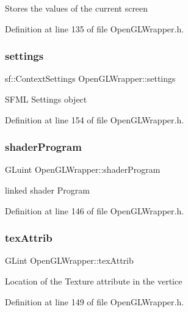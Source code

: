 Stores the values of the current screen 

Definition at line 135 of file Open\+G\+L\+Wrapper.\+h.

\mbox{\label{classOpenGLWrapper_a7d4d65ea4174aad513c93a7e287c46d5}} 
\subsubsection{\texorpdfstring{settings}{settings}}
{\footnotesize\ttfamily sf\+::\+Context\+Settings Open\+G\+L\+Wrapper\+::settings\hspace{0.3cm}{\ttfamily [private]}}

S\+F\+ML Settings object 

Definition at line 154 of file Open\+G\+L\+Wrapper.\+h.

\mbox{\label{classOpenGLWrapper_a171549c356bdf33cef0e24bfdf1f2d25}} 
\subsubsection{\texorpdfstring{shaderProgram}{shaderProgram}}
{\footnotesize\ttfamily G\+Luint Open\+G\+L\+Wrapper\+::shader\+Program\hspace{0.3cm}{\ttfamily [private]}}

linked shader Program 

Definition at line 146 of file Open\+G\+L\+Wrapper.\+h.

\mbox{\label{classOpenGLWrapper_a4584c807d7a7fa892de4e30b7faad65a}} 
\subsubsection{\texorpdfstring{texAttrib}{texAttrib}}
{\footnotesize\ttfamily G\+Lint Open\+G\+L\+Wrapper\+::tex\+Attrib\hspace{0.3cm}{\ttfamily [private]}}

Location of the Texture attribute in the vertice 

Definition at line 149 of file Open\+G\+L\+Wrapper.\+h.

